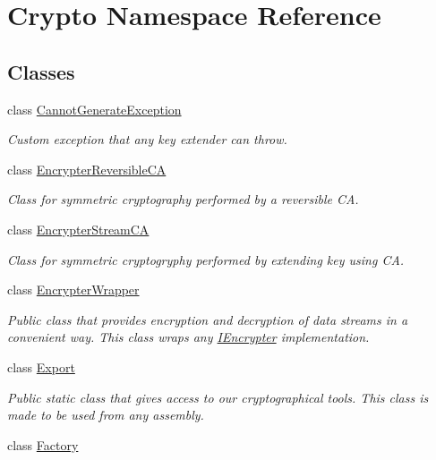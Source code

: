 \hypertarget{namespace_crypto}{}\section{Crypto Namespace Reference}
\label{namespace_crypto}
\subsection*{Classes}
\begin{DoxyCompactItemize}
\item 
class \hyperlink{class_crypto_1_1_cannot_generate_exception}{Cannot\+Generate\+Exception}
\begin{DoxyCompactList}\small\item\em Custom exception that any key extender can throw. \end{DoxyCompactList}\item 
class \hyperlink{class_crypto_1_1_encrypter_reversible_c_a}{Encrypter\+Reversible\+C\+A}
\begin{DoxyCompactList}\small\item\em Class for symmetric cryptography performed by a reversible C\+A. \end{DoxyCompactList}\item 
class \hyperlink{class_crypto_1_1_encrypter_stream_c_a}{Encrypter\+Stream\+C\+A}
\begin{DoxyCompactList}\small\item\em Class for symmetric cryptogryphy performed by extending key using C\+A. \end{DoxyCompactList}\item 
class \hyperlink{class_crypto_1_1_encrypter_wrapper}{Encrypter\+Wrapper}
\begin{DoxyCompactList}\small\item\em Public class that provides encryption and decryption of data streams in a convenient way. This class wraps any {\ttfamily \hyperlink{interface_crypto_1_1_i_encrypter}{I\+Encrypter}} implementation. \end{DoxyCompactList}\item 
class \hyperlink{class_crypto_1_1_export}{Export}
\begin{DoxyCompactList}\small\item\em Public static class that gives access to our cryptographical tools. This class is made to be used from any assembly. \end{DoxyCompactList}\item 
class \hyperlink{class_crypto_1_1_factory}{Factory}

\end{DoxyCompactItemize}
